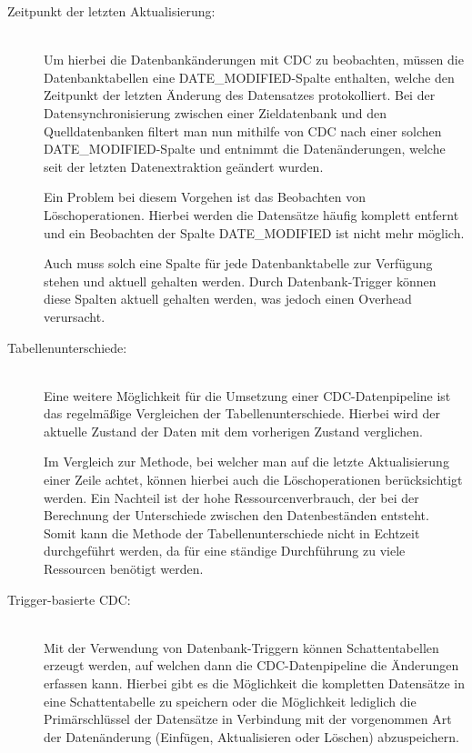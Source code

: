 \begin{description}
    \item[Zeitpunkt der letzten Aktualisierung:]\hfill \\
    Um hierbei die Datenbankänderungen mit CDC zu beobachten, müssen die Datenbanktabellen eine \glqq DATE\_MODIFIED\grqq{}-Spalte enthalten, welche den Zeitpunkt der letzten Änderung des Datensatzes protokolliert. Bei der Datensynchronisierung zwischen einer Zieldatenbank und den Quelldatenbanken filtert man nun mithilfe von CDC nach einer solchen \glqq DATE\_MODIFIED\grqq{}-Spalte und entnimmt die Datenänderungen, welche seit der letzten Datenextraktion geändert wurden.

    Ein Problem bei diesem Vorgehen ist das Beobachten von Löschoperationen. Hierbei werden die Datensätze häufig komplett entfernt und ein Beobachten der Spalte \glqq DATE\_MODIFIED\grqq{} ist nicht mehr möglich.

    Auch muss solch eine Spalte für jede Datenbanktabelle zur Verfügung stehen und aktuell gehalten werden. Durch Datenbank-Trigger können diese Spalten aktuell gehalten werden, was jedoch einen Overhead verursacht.

    \item[Tabellenunterschiede:]\hfill \\
    Eine weitere Möglichkeit für die Umsetzung einer CDC-Datenpipeline ist das regelmäßige Vergleichen der Tabellenunterschiede. Hierbei wird der aktuelle Zustand der Daten mit dem vorherigen Zustand verglichen.

    Im Vergleich zur Methode, bei welcher man auf die letzte Aktualisierung einer Zeile achtet, können hierbei auch die Löschoperationen berücksichtigt werden. Ein Nachteil ist der hohe Ressourcenverbrauch, der bei der Berechnung der Unterschiede zwischen den Datenbeständen entsteht. Somit kann die Methode der Tabellenunterschiede nicht in Echtzeit durchgeführt werden, da für eine ständige Durchführung zu viele Ressourcen benötigt werden.

    \item[Trigger-basierte CDC:]\hfill \\
    Mit der Verwendung von Datenbank-Triggern können Schattentabellen erzeugt werden, auf welchen dann die CDC-Datenpipeline die Änderungen erfassen kann. Hierbei gibt es die Möglichkeit die kompletten Datensätze in eine Schattentabelle zu speichern oder die Möglichkeit lediglich die Primärschlüssel der Datensätze in Verbindung mit der vorgenommen Art der Datenänderung (Einfügen, Aktualisieren oder Löschen) abzuspeichern.


\end{description}
